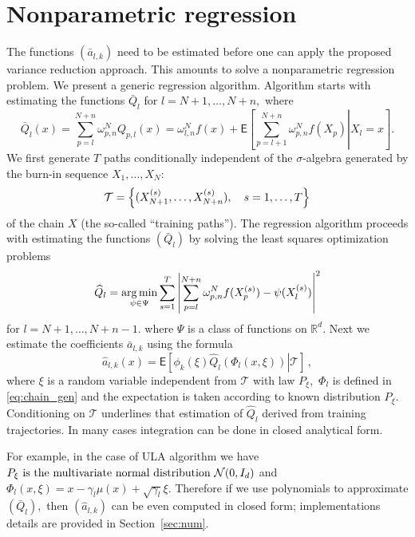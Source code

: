 \documentclass[bj]{imsart}
\def\NtrainPath{T}
\def\TrainSet{\mathcal{T}}
\newcommand*{\argmin}{\operatornamewithlimits{arg\,min}}
\begin{document}
\section{Nonparametric regression}
The functions \((\bar a_{l,k})\) need to be estimated before one can apply the proposed variance reduction approach. This amounts to solve a nonparametric regression problem.
We present a generic regression algorithm. Algorithm starts with estimating the functions $\bar{Q}_{l}$ for $l=N+1,\ldots,N+n,$ where
\begin{equation*}
\bar{Q}_{l}(x)=\sum_{p=l}^{N+n} \omega_{p,n}^{N} Q_{p,l}\left(x\right)=\omega_{l,n}^{N}f(x)+\mathsf{E}\left[\left.\sum_{p=l+1}^{N+n}\omega_{p,n}^{N}f(X_{p})\right|X_{l}=x\right] .
\end{equation*}
We first generate \(\NtrainPath\)  paths conditionally independent of the $\sigma$-algebra generated by the burn-in sequence $X_1,\dots,X_N$:
\[
\TrainSet=\Bigl\{(X^{(s)}_{N+1},\ldots,X^{(s)}_{N+n}),\quad s=1,\ldots,\NtrainPath\Bigr\}
\]
of the chain \(X\)
(the so-called ``training paths'').
The regression algorithm proceeds with estimating the  functions \((\bar Q_{l})\) by solving  the least squares optimization problems
\begin{equation}\label{eq:06042018a1}
{\widehat  Q}_{l}=\argmin_{\psi\in \Psi}\sum_{s=1}^{\NtrainPath} \left | \sum_{p=l}^{N+n}\omega_{p,n}^{N}f(X^{(s)}_{p})-\psi(X^{(s)}_{l})\right|^2
\end{equation}
for \(l=N+1,\ldots, N+n-1.\)
where \(\Psi\) is a  class of  functions on \(\mathbb{R}^d.\)
Next  we estimate the coefficients \( \bar a_{l,k}\) using
the formula
\begin{equation}
\label{eq:a_est_int}
\widehat a_{l,k}(x)=\mathsf{E}\left[\left.\phi_k\left(\xi\right)\widehat Q_{l}\left(\Phi_l(x,\xi)\right)\right | \TrainSet\right] \,,
\end{equation}
where $\xi$ is a random variable independent from $\mathcal{T}$ with law $P_\xi,$
$\Phi_l$ is defined in \eqref{eq:chain_gen} and the expectation is taken according to known distribution \(P_\xi\). Conditioning on $\TrainSet$ underlines that estimation of $\widehat Q_{l}$ derived from training trajectories. In many cases integration can be done in closed analytical form.

 For example, in the case of ULA algorithm we have \(P_\xi$ is the multivariate normal distribution $ \mathcal{N}(0,I_d)\) and \(\Phi_l(x,\xi)=x-\gamma_{l}\mu(x)+\sqrt{\gamma_{l}}\xi.\) Therefore if we use polynomials to approximate \((\bar Q_{l}),\) then \((\widehat a_{l,k})\) can be even computed in closed form; implementations details are provided in  Section~\ref{sec:num}.
\end{document}
